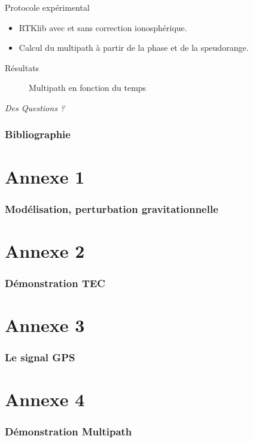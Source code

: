 \documentclass[xcolor=dvipsnames,envcountsect]{beamer}
\begin{document}
\begin{frame}{Protocole expérimental}
	\begin{itemize}
		\item RTKlib avec et sans correction ionosphérique.
		\item Calcul du multipath à partir de la phase et de la speudorange.
	\end{itemize}
\end{frame}

\begin{frame}{Résultats}
	\begin{figure}
		\centering
		\caption {Multipath en fonction du temps}	
	\end{figure}
\end{frame}

\begin{frame}
	\centering
	\begin{block}
		\scshape
			\begin{center}
				\Huge\emph{Des Questions ?}
			\end{center}
	\end{block}
\end{frame}

\appendix
\begin{frame}
	\frametitle{Bibliographie}
	\printbibliography
\end{frame}

\section{Annexe 1}
\begin{frame}
	\frametitle{Modélisation, perturbation gravitationnelle}
	
\end{frame}

\section{Annexe 2}
\begin{frame}
	\frametitle{Démonstration TEC}
\end{frame}

\section{Annexe 3}
\begin{frame}
	\frametitle{Le signal GPS}
\end{frame}

\section{Annexe 4}
\begin{frame}
	\frametitle{Démonstration Multipath}
\end{frame}
\end{document}
